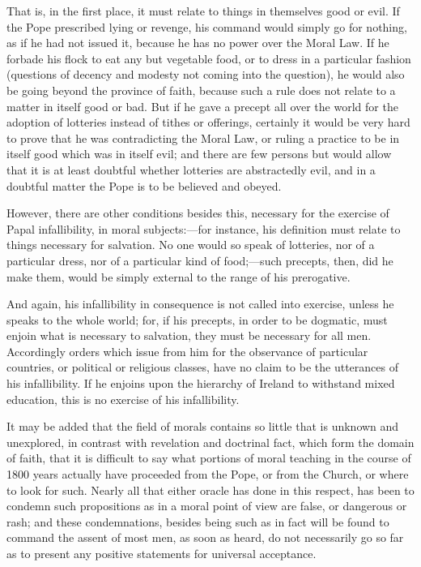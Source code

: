 That is, in the first place, it must relate to things in themselves
good or evil. If the Pope prescribed lying or revenge, his command would
simply go for nothing, as if he had not issued it, because he has no
power over the Moral Law. If he forbade his flock to eat any but
vegetable food, or to dress in a particular fashion (questions of
decency and modesty not coming into the question), he would also be
going beyond the province of faith, because such a rule does not relate
to a matter in itself good or bad. But if he gave a precept all over the
world for the adoption of lotteries instead of tithes or offerings,
certainly it would be very hard to prove that he was contradicting the
Moral Law, or ruling a practice to be in itself good which was in itself
evil; and there are few persons but would allow that it is at least
doubtful whether lotteries are abstractedly evil, and in a doubtful
matter the Pope is to be believed and obeyed.

However, there are other conditions besides this, necessary for the
exercise of Papal infallibility, in moral subjects:—for instance, his
definition must relate to things necessary for salvation. No one would
so speak of lotteries, nor of a particular dress, nor of a particular
kind of food;—such precepts, then, did he make them, would be simply
external to the range of his prerogative.

And again, his infallibility in consequence is not called into
exercise, unless he speaks to the whole world; for, if his precepts, in
order to be dogmatic, must enjoin what is necessary to salvation, they
must be necessary for all men. Accordingly orders which issue from him
for the observance of particular countries, or political or religious
classes, have no claim to be the utterances of his infallibility. If he
enjoins upon the hierarchy of Ireland to withstand mixed education, this
is no exercise of his infallibility.

It may be added that the field of morals contains so little that is
unknown and unexplored, in contrast with revelation and doctrinal fact,
which form the domain of faith, that it is difficult to say what
portions of moral teaching in the course of 1800 years actually have
proceeded from the Pope, or from the Church, or where to look for such.
Nearly all that either oracle has done in this respect, has been to
condemn such propositions as in a moral point of view are false, or
dangerous or rash; and these condemnations, besides being such as in
fact will be found to command the assent of most men, as soon as heard,
do not necessarily go so far as to present any positive statements for
universal acceptance.

